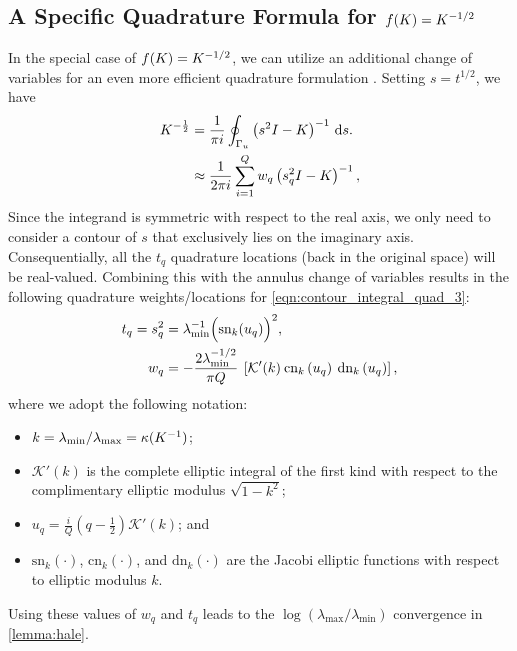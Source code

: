 \subsection{A Specific Quadrature Formula for $f(K) = K^{-1/2}$}
In the special case of $f(K) = K^{-1/2}$, we can utilize an additional change of variables for an even more efficient quadrature formulation \citep[][Sec. 4]{hale2008computing}.
Setting $s = t^{1/2}$, we have
%
\begin{align}
	K^{-\frac 1 2}
  &= \frac{1}{\pi i} \oint_{\Gamma_u} \left( s^2 I - K \right)^{-1} \,\mathrm{d}{s}.
  \nonumber
  \\
  &\approx
  \frac{1}{2 \pi i} \sum_{i=1}^Q w_q \left( s_q^2 I - K \right)^{-1},
  \label{eqn:contour_integral_quad_3}
\end{align}
%
Since the integrand is symmetric with respect to the real axis, we only need to consider a contour of $s$ that exclusively lies on the imaginary axis.
Consequentially, all the $t_q$ quadrature locations (back in the original space) will be real-valued.
Combining this with the annulus change of variables results in the following quadrature weights/locations for \cref{eqn:contour_integral_quad_3}:
%
\begin{equation}
  \begin{split}
    t_q = s_q^2
    &= \lambda_\text{min}^{-1} \Bigl( \text{sn}_k(u_q) \Bigr)^2,
    \\
    w_q
    &= -\frac{ 2 \lambda_\text{min}^{-1/2}  }{ \pi Q }
    \: \left[
    \mathcal{K}'( k )
    \: \text{cn}_k \left( u_q \right)
    \: \text{dn}_k \left( u_q \right)
    \right],
  \end{split}
  \label{eqn:quad_points_and_locations}
\end{equation}
%
where we adopt the following notation:
\begin{itemize}
  \item $k = \lambda_\text{min} / \lambda_\text{max} = \kappa(K^{-1})$;
  \item $\mathcal{K}'(k)$ is the complete elliptic integral of the first kind with respect to the complimentary elliptic modulus $\sqrt{1 - k^2}$;
  \item $u_q = \frac{i}{Q}(q - \frac 1 2) \mathcal{K}'(k)$; and
  \item $\text{sn}_k(\cdot)$, $\text{cn}_k(\cdot)$, and $\text{dn}_k(\cdot)$ are the Jacobi elliptic functions with respect to elliptic modulus $k$.
\end{itemize}
Using these values of $w_q$ and $t_q$ leads to the $\log(\lambda_\text{max} / \lambda_\text{min})$ convergence in \cref{lemma:hale}.

